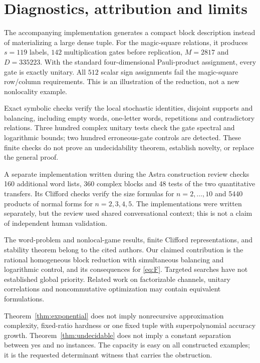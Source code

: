 \documentclass[11pt]{article}
\begin{document}
\section{Diagnostics, attribution and limits}
The accompanying implementation generates a compact block description instead of materializing a large dense tuple. For the magic-square relations, it produces $s=119$ labels, $142$ multiplication gates before replication, $M=2817$ and $D=335223$. With the standard four-dimensional Pauli-product assignment, every gate is exactly unitary. All $512$ scalar sign assignments fail the magic-square row/column requirements. This is an illustration of the reduction, not a new nonlocality example.

Exact symbolic checks verify the local stochastic identities, disjoint supports and balancing, including empty words, one-letter words, repetitions and contradictory relations. Three hundred complex unitary tests check the gate spectral and logarithmic bounds; two hundred erroneous-gate controls are detected. These finite checks do not prove an undecidability theorem, establish novelty, or replace the general proof.

A separate implementation written during the Astra construction review checks 160 additional word lists, 360 complex blocks and 48 tests of the two quantitative transfers. Its Clifford checks verify the size formulas for $n=2,\ldots,10$ and 5440 products of normal forms for $n=2,3,4,5$. The implementations were written separately, but the review used shared conversational context; this is not a claim of independent human validation.

The word-problem and nonlocal-game results, finite Clifford representations, and stability theorem belong to the cited authors. Our claimed contribution is the rational homogeneous block reduction with simultaneous balancing and logarithmic control, and its consequences for \eqref{eq:F}. Targeted searches have not established global priority. Related work on factorizable channels, unitary correlations and noncommutative optimization may contain equivalent formulations.

Theorem~\ref{thm:exponential} does not imply nonrecursive approximation complexity, fixed-ratio hardness or one fixed tuple with superpolynomial accuracy growth. Theorem~\ref{thm:undecidable} does not imply a constant separation between yes and no instances. The capacity is easy on all constructed examples; it is the requested determinant witness that carries the obstruction.
\end{document}
